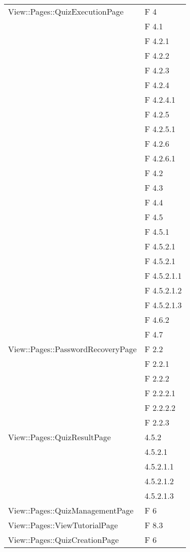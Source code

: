 \begin{longtable}{p{}p{}}
\midrule
View::Pages::QuizExecutionPage	& F 4\\
								& F 4.1\\
								& F 4.2.1\\
								& F 4.2.2\\
								& F 4.2.3\\
								& F 4.2.4\\
								& F 4.2.4.1\\
								& F 4.2.5\\
								& F 4.2.5.1\\
								& F 4.2.6\\
								& F 4.2.6.1\\
								& F 4.2\\
								& F 4.3\\
								& F 4.4\\
								& F 4.5\\
								& F 4.5.1\\
								& F 4.5.2.1\\
								& F 4.5.2.1\\
								& F 4.5.2.1.1\\
								& F 4.5.2.1.2\\
								& F 4.5.2.1.3\\
								& F 4.6.2\\
& F 4.7\\

\midrule
View::Pages::PasswordRecoveryPage	& F 2.2\\
								& F 2.2.1\\
								& F 2.2.2\\
								& F 2.2.2.1\\
								& F 2.2.2.2\\
								& F 2.2.3\\

\midrule
View::Pages::QuizResultPage	& 4.5.2\\
								& 4.5.2.1\\
								& 4.5.2.1.1\\
								& 4.5.2.1.2\\
								& 4.5.2.1.3\\	
							
\midrule
View::Pages::QuizManagementPage	& F 6\\

\midrule
View::Pages::ViewTutorialPage	& F 8.3\\

\midrule
View::Pages::QuizCreationPage	& F 6\\


\end{longtable}

